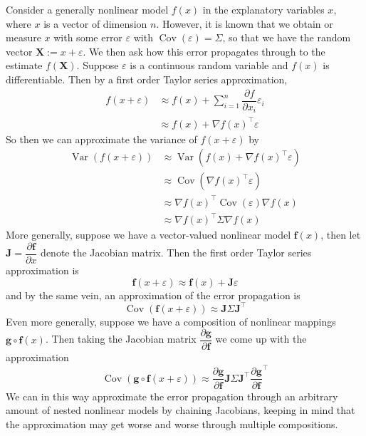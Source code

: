 \documentclass[11pt]{report} %
\begin{document}
Consider a generally nonlinear model $f\left(x\right)$ in the explanatory variables $x$, where $x$ is a vector of dimension $n$. However, it is known that we obtain or measure $x$ with some error $\varepsilon$ with $\operatorname{Cov}\left(\varepsilon\right) = \Sigma$, so that we have the random vector $\mathbf{X} := x + \varepsilon$. We then ask how this error propagates through to the estimate $f\left(\mathbf{X}\right)$. Suppose $\varepsilon$ is a continuous random variable and $f\left(x\right)$ is differentiable. Then by a first order Taylor series approximation,
\begin{align}
f\left(x + \varepsilon\right) &\approx f\left(x\right) + \sum_{i = 1}^{n}\dfrac{\partial f}{\partial x_{i}}\varepsilon_{i} \\
&\approx f\left(x\right) + \nabla f\left(x\right)^{\top}\varepsilon
\end{align}
So then we can approximate the variance of $f\left(x + \varepsilon\right)$ by
\begin{align}
\operatorname{Var}\left(f\left(x + \varepsilon\right)\right) &\approx \operatorname{Var}\left(f\left(x\right) + \nabla f\left(x\right)^{\top}\varepsilon\right) \\
&\approx \operatorname{Cov}\left(\nabla f\left(x\right)^{\top}\varepsilon\right) \\
&\approx \nabla f\left(x\right)^{\top}\operatorname{Cov}\left(\varepsilon\right)\nabla f\left(x\right) \\
&\approx \nabla f\left(x\right)^{\top}\Sigma\nabla f\left(x\right)
\end{align}
More generally, suppose we have a vector-valued nonlinear model $\mathbf{f}\left(x\right)$, then let $\mathbf{J} = \dfrac{\partial \mathbf{f}}{\partial x}$ denote the Jacobian matrix. Then the first order Taylor series approximation is
\begin{equation}
\mathbf{f}\left(x + \varepsilon\right) \approx \mathbf{f}\left(x\right) + \mathbf{J}\varepsilon
\end{equation}
and by the same vein, an approximation of the error propagation is
\begin{equation}
\operatorname{Cov}\left(\mathbf{f}\left(x + \varepsilon\right)\right) \approx \mathbf{J}\Sigma\mathbf{J}^{\top}
\end{equation}
Even more generally, suppose we have a composition of nonlinear mappings $\mathbf{g}\circ \mathbf{f}\left(x\right)$. Then taking the Jacobian matrix $\dfrac{\partial \mathbf{g}}{\partial \mathbf{f}}$ we come up with the approximation
\begin{equation}
\operatorname{Cov}\left(\mathbf{g}\circ\mathbf{f}\left(x + \varepsilon\right)\right) \approx \dfrac{\partial \mathbf{g}}{\partial \mathbf{f}}\mathbf{J}\Sigma\mathbf{J}^{\top}\dfrac{\partial \mathbf{g}}{\partial \mathbf{f}}^{\top}
\end{equation}
We can in this way approximate the error propagation through an arbitrary amount of nested nonlinear models by chaining Jacobians, keeping in mind that the approximation may get worse and worse through multiple compositions.
\end{document}
